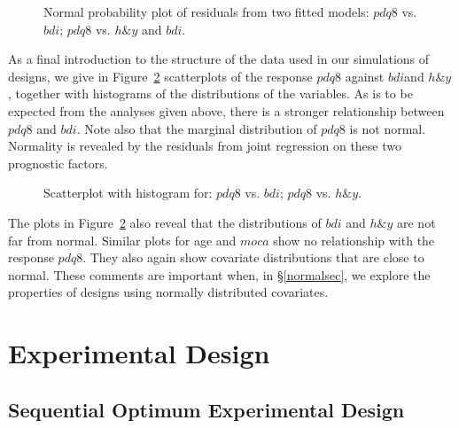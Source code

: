 \documentclass[number,12pt,review]{elsarticle}
\begin{document}
\begin{figure}[ht]
\centering
 \hspace*{4mm}%
 \caption{Normal probability plot of  residuals from two fitted models:
  \protect{} $pdq8$ vs. $bdi$;
 \protect{} $pdq8$ vs. $h\&y$ and $bdi$.}
 \label{QQplots2models}
\end{figure}

As a final introduction to the structure of the data used in our simulations of designs, we give in Figure~\ref{Scatters} scatterplots of the response $pdq8$ against $bdi$and $h\&y$, together with histograms of the distributions of the variables. As is to be expected from the analyses given above, there is a stronger relationship between
$pdq8$ and $bdi$. Note also that the marginal distribution of $pdq8$ is not normal. Normality is revealed by the residuals from joint regression on these two prognostic factors.

\begin{figure}[ht]
\centering
 \hspace*{4mm}%
 \caption{Scatterplot with histogram for:
  \protect{} $pdq8$ vs. $bdi$;
 \protect{} $pdq8$ vs. $h\&y$.}
 \label{Scatters}
\end{figure}

The plots in Figure~\ref{Scatters} also reveal that the distributions of $bdi$ and $h\&y$ are not far from normal. Similar plots for age and $moca$ show no relationship with the response $pdq8$. They also again show covariate distributions that are close to normal. These comments are important when, in \S\ref{normalsec}, we explore the properties of designs using normally distributed covariates.

\section{Experimental Design}

\label{DesSec}

\subsection{Sequential Optimum Experimental Design}
\end{document}
